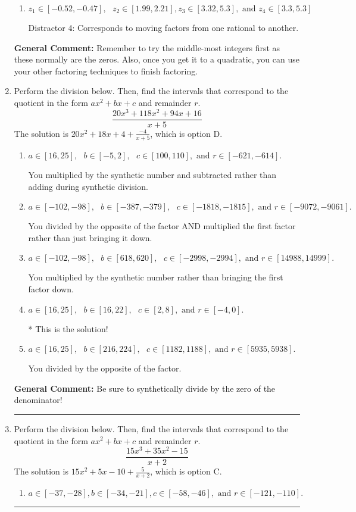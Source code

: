 \documentclass{extbook}[14pt]
\newcommand{\litem}[1]{\item #1

\rule{\textwidth}{0.4pt}}
\begin{document}
\begin{enumerate}
{\begin{enumerate}[label=\Alph*.]
 Distractor 3: Corresponds to negatives of all zeros AND inversing rational roots.
\item \( z_1 \in [-0.52, -0.47], \text{   }  z_2 \in [1.99, 2.21], z_3 \in [3.32, 5.3], \text{   and   } z_4 \in [3.3, 5.3] \)

 Distractor 4: Corresponds to moving factors from one rational to another.
\end{enumerate}

\textbf{General Comment:} Remember to try the middle-most integers first as these normally are the zeros. Also, once you get it to a quadratic, you can use your other factoring techniques to finish factoring.
}
\litem{
Perform the division below. Then, find the intervals that correspond to the quotient in the form $ax^2+bx+c$ and remainder $r$.
\[ \frac{20x^{3} +118 x^{2} +94 x + 16}{x + 5} \]The solution is \( 20x^{2} +18 x + 4 + \frac{-4}{x + 5} \), which is option D.\begin{enumerate}[label=\Alph*.]
\item \( a \in [16, 25], \text{   } b \in [-5, 2], \text{   } c \in [100, 110], \text{   and   } r \in [-621, -614]. \)

 You multiplied by the synthetic number and subtracted rather than adding during synthetic division.
\item \( a \in [-102, -98], \text{   } b \in [-387, -379], \text{   } c \in [-1818, -1815], \text{   and   } r \in [-9072, -9061]. \)

 You divided by the opposite of the factor AND multiplied the first factor rather than just bringing it down.
\item \( a \in [-102, -98], \text{   } b \in [618, 620], \text{   } c \in [-2998, -2994], \text{   and   } r \in [14988, 14999]. \)

 You multiplied by the synthetic number rather than bringing the first factor down.
\item \( a \in [16, 25], \text{   } b \in [16, 22], \text{   } c \in [2, 8], \text{   and   } r \in [-4, 0]. \)

* This is the solution!
\item \( a \in [16, 25], \text{   } b \in [216, 224], \text{   } c \in [1182, 1188], \text{   and   } r \in [5935, 5938]. \)

 You divided by the opposite of the factor.
\end{enumerate}

\textbf{General Comment:} Be sure to synthetically divide by the zero of the denominator!
}
\litem{
Perform the division below. Then, find the intervals that correspond to the quotient in the form $ax^2+bx+c$ and remainder $r$.
\[ \frac{15x^{3} +35 x^{2} -15}{x + 2} \]The solution is \( 15x^{2} +5 x -10 + \frac{5}{x + 2} \), which is option C.\begin{enumerate}[label=\Alph*.]
\item \( a \in [-37, -28], b \in [-34, -21], c \in [-58, -46], \text{ and } r \in [-121, -110]. \)


\end{enumerate}}
\end{enumerate}
\end{document}
